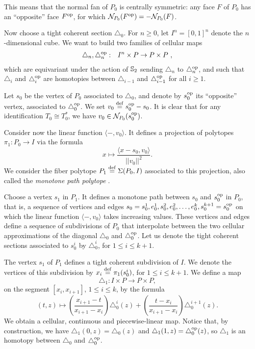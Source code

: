 This means that the normal fan of $P_0$ is centrally symmetric: any face $F$ of $P_0$ has an ``opposite'' face $F^{\op}$, for which $\mathcal{N}_{P_0}(F^{\op}) = -\mathcal{N}_{P_0}(F)$.

Now choose a tight coherent section $\triangle_0$.
For $n\geq 0$, let $I^n=[0,1]^n$ denote the $n$-dimensional cube.
We want to build two families of cellular maps
\begin{eqnarray*}
\triangle_n, \triangle^{\op}_n & : & I^n \times P \to P \times P  \ ,
\end{eqnarray*}
which are equivariant under the action of $\S_2$ sending $\triangle_n$ to $\triangle^{\op}_n$, and such that $\triangle_i$ and $\triangle_i^{\op}$ are homotopies between $\triangle_{i-1}$ and $\triangle_{i-1}^{\op}$ for all $i \geq 1$.

Let $s_0$ be the vertex of $P_0$ associated to $\triangle_0$, and denote by $s_0^{\op}$ its ``opposite'' vertex, associated to $\triangle_0^{\op}$. We set $v_0 \defeq s_0^{\op}-s_0$. It is clear that for any identification $T_0 \cong T_0^{*}$, we have $v_0 \in \mathcal{N}_{P_0}(s_0^{\op})$.

Consider now the linear function $\langle - , v_0 \rangle$.
It defines a projection of polytopes $\pi_1 \colon P_0 \to I$ via the formula
\[
x \mapsto \frac{\langle x-s_0, v_0 \rangle}{||v_0||^2}.
\]
We consider the fiber polytope $P_1 \defeq \Sigma(P_0,I)$ associated to this projection, also called the \emph{monotone path polytope} \cite[Chapter 9]{Ziegler95}.

Choose a vertex $s_1$ in $P_1$.
It defines a monotone path between $s_0$ and $s^{\op}_0$ in $P_0$, that is, a sequence of vertices and edges $s_0 = s_0^1, e_0^1, s_0^2, e_0^2, \dots, e_0^k, s_0^{k+1} = s^{\op}_0$ on which the linear function $\langle - , v_0 \rangle$ takes increasing values.
These vertices and edges define a sequence of subdivisions of $P_0$ that interpolate between the two cellular approximations of the diagonal $\triangle_0$ and $\triangle^{\op}_0$.
Let us denote the tight coherent sections associated to $s_0^i$ by $\triangle_0^i$, for $1 \leq i \leq k+1$.

The vertex $s_1$ of $P_1$ defines a tight coherent subdivision of $I$.
We denote the vertices of this subdivision by $x_i \defeq \pi_1(s_0^i)$, for $1 \leq i \leq k+1$.
We define a map
\[
\triangle_1 \colon I \times P \to P \times P,
\]
on the segment $[x_i, x_{i+1}]$, $1 \leq i \leq k$, by the formula
\[
(t,z) \mapsto \left( \frac{x_{i+1}-t}{x_{i+1}-x_i} \right) \triangle_0^{i}(z) + \left( \frac{t-x_{i}}{x_{i+1}-x_i} \right) \triangle_0^{i+1}(z).
\]
We obtain a cellular, continuous and piecewise-linear map.
Notice that, by construction, we have $\triangle_1(0,z)=\triangle_0(z)$ and $\triangle_1(1,z)=\triangle_0^{\op}(z)$, so $\triangle_1$ is an homotopy between $\triangle_0$ and $\triangle_0^{\op}$.

